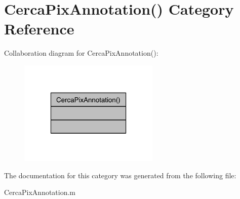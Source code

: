 \hypertarget{category_cerca_pix_annotation_07_08}{\section{Cerca\-Pix\-Annotation() Category Reference}
\label{category_cerca_pix_annotation_07_08}
}


Collaboration diagram for Cerca\-Pix\-Annotation()\-:\nopagebreak
\begin{figure}[H]
\begin{center}
\leavevmode
\includegraphics[width=190pt]{category_cerca_pix_annotation_07_08__coll__graph}
\end{center}
\end{figure}


The documentation for this category was generated from the following file\-:\begin{DoxyCompactItemize}
\item 
Cerca\-Pix\-Annotation.\-m\end{DoxyCompactItemize}
